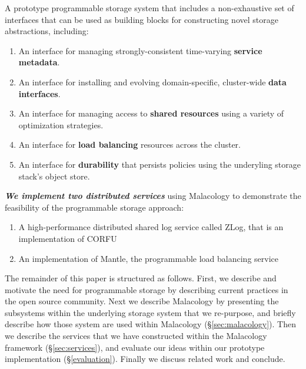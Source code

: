 \documentclass[preprint]{sigplanconf-eurosys}
\begin{document}
A prototype programmable storage system that includes a non-exhaustive set of
interfaces that can be used as building blocks for constructing novel storage
abstractions, including:

\begin{enumerate}

\item An interface for managing strongly-consistent time-varying \textbf{service
metadata}.

\item An interface for installing and evolving domain-specific, cluster-wide
\textbf{data interfaces}.

\item An interface for managing access to \textbf{shared resources} using a
variety of optimization strategies.

\item An interface for \textbf{load balancing} resources across the cluster.

\item An interface for \textbf{durability} that persists policies using the
underyling storage stack's object store.

\end{enumerate}

{\it \textbf{We implement two distributed services}} using 
Malacology to demonstrate the feasibility of the programmable storage approach:

\begin{enumerate}

\item A high-performance distributed shared log service called ZLog, that is an
implementation of CORFU~\cite{balakrishnan_corfu_2012}

\item An implementation of Mantle, the programmable load balancing
service~\cite{sevilla:sc15-mantle}

\end{enumerate}

The remainder of this paper is structured as follows. First, we describe and
motivate the need for programmable storage by describing current practices in
the open source community. Next we describe Malacology by presenting the
subsystems within the underlying storage system that we re-purpose, and briefly
describe how those system are used within Malacology (\S\ref{sec:malacology}).
Then we describe the services that we have constructed within the Malacology
framework (\S\ref{sec:services}), and evaluate our ideas within our prototype
implementation (\S\ref{evaluation}).  Finally we discuss related work and
conclude.
\end{document}
